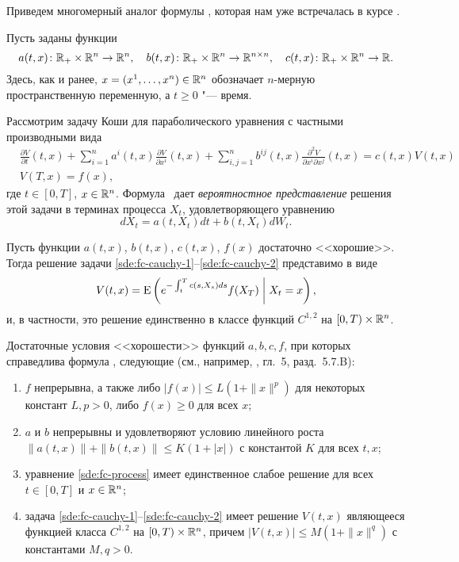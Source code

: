 Приведем многомерный аналог формулы \fc, которая нам уже встречалась в курсе \intro.

Пусть заданы функции 
\[
a(t,x)\colon \mathbb{R}_+\times \mathbb{R}^n \to \mathbb{R}^n, \quad
b(t,x)\colon \mathbb{R}_+\times \mathbb{R}^n \to \mathbb{R}^{n\times n}, \quad
c(t,x)\colon \mathbb{R}_+\times \mathbb{R}^n \to \mathbb{R}.
\]
Здесь, как и ранее, $x=(x^1,\dots,x^n)\in\mathbb{R}^n$ обозначает $n$-мерную пространственную переменную, а $t\ge 0$ "--- время.

Рассмотрим задачу Коши для параболического уравнения с частными производными вида
\begin{align}
\label{sde:fc-cauchy-1}
&\frac{\partial V}{\partial t}(t,x) + \sum_{i=1}^n a^i(t,x)\frac{\partial V}{\partial x^i}(t,x) + 
\sum_{i,j=1}^n b^{ij}(t,x)\frac{\partial^2 V}{\partial x^i \partial x^j}(t,x)
= c(t,x)V(t,x)\\
\label{sde:fc-cauchy-2}
&V(T,x) = f(x),
\end{align}
где $t\in[0,T]$, $x\in\mathbb{R}^n$.
Формула \fc\ дает \emph{вероятностное представление} решения этой задачи в терминах процесса $X_t$, удовлетворяющего уравнению 
\begin{equation}
\label{sde:fc-process}
dX_t = a(t,X_t) dt + b(t,X_t) dW_t.
\end{equation}

\begin{theorem}
Пусть функции $a(t,x)$, $b(t,x)$, $c(t,x)$, $f(x)$ достаточно <<хорошие>>.
Тогда решение задачи  \eqref{sde:fc-cauchy-1}--\eqref{sde:fc-cauchy-2} представимо в виде
\begin{equation}
\label{sde:fc-v}
V(t,x) = \operatorname{E}\left(e^{-\int_t^T c(s,X_s)ds} f(X_T) \;\bigg|\; X_t = x\right),
\end{equation}
и, в частности, это решение единственно в классе функций $C^{1,2}$ на $[0,T)\times \mathbb{R}^n$.
\end{theorem}

\begin{remark}
Достаточные условия <<хорошести>> функций $a,b,c,f$, при которых справедлива формула \fc, следующие (см., например, \cite{KaratzasShreve91}, гл.~5, разд.~5.7.B):
\begin{enumerate}
\item $f$ непрерывна, а также либо $|f(x)| \le L(1+ \|x\|^p)$ для некоторых констант $L,p>0$, либо $f(x)\ge 0$ для всех $x$;
\item $a$ и $b$ непрерывны и удовлетворяют условию линейного роста $\|a(t,x)\| + \|b(t,x)\| \le K(1+|x|)$ с константой $K$ для всех $t,x$;
\item уравнение \eqref{sde:fc-process} имеет единственное слабое решение для всех $t\in[0,T]$ и $x\in\mathbb{R}^n$;
\item задача \eqref{sde:fc-cauchy-1}--\eqref{sde:fc-cauchy-2} имеет решение $V(t,x)$ являющееся функцией класса $C^{1,2}$ на $[0,T)\times\mathbb{R}^n$, причем $|V(t,x)| \le M(1+\|x\|^q)$ с константами $M,q>0$.
\end{enumerate}
\end{remark}


